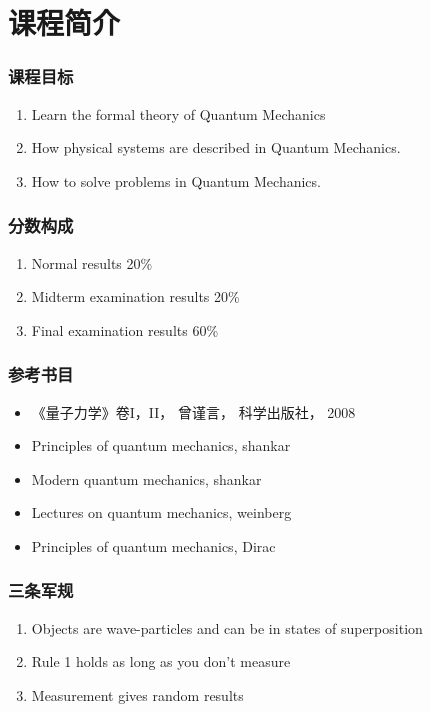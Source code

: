 \section{课程简介}

\begin{frame}
    \frametitle{课程目标}
        \begin{enumerate}
            \item Learn the formal theory of Quantum Mechanics
            \item How physical systems are described in Quantum Mechanics.
            \item How to solve problems in Quantum Mechanics.
        \end{enumerate}
\end{frame}
\begin{frame}
    \frametitle{分数构成}
        \begin{enumerate}
            \item Normal results 20\%
            \item Midterm examination results 20\%
            \item Final examination results 60\%
        \end{enumerate}
\end{frame}

\begin{frame}
    \frametitle{参考书目}
        \begin{itemize}
            \item 《量子力学》卷I，II， 曾谨言， 科学出版社， 2008           
            \item Principles of quantum mechanics, shankar
            \item Modern quantum mechanics, shankar
            \item Lectures on quantum mechanics, weinberg
            \item Principles of quantum mechanics, Dirac
        \end{itemize}
\end{frame}

\begin{frame}
    \frametitle{三条军规}
        \begin{enumerate}
            \item Objects are wave-particles and can be in states of superposition
            \item Rule 1 holds as long as you don't measure
            \item Measurement gives random results
        \end{enumerate}
\end{frame}


